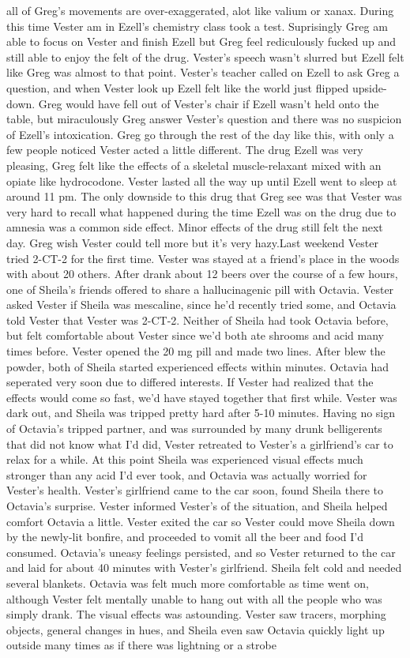 \documentclass[12pt]{book}
\begin{document}
all of Greg's movements are over-exaggerated, alot like valium or xanax. During this time Vester am in Ezell's chemistry class took a test. Suprisingly Greg am able to focus on Vester and finish Ezell but Greg feel rediculously fucked up and still able to enjoy the felt of the drug. Vester's speech wasn't slurred but Ezell felt like Greg was almost to that point. Vester's teacher called on Ezell to ask Greg a question, and when Vester look up Ezell felt like the world just flipped upside-down. Greg would have fell out of Vester's chair if Ezell wasn't held onto the table, but miraculously Greg answer Vester's question and there was no suspicion of Ezell's intoxication. Greg go through the rest of the day like this, with only a few people noticed Vester acted a little different. The drug Ezell was very pleasing, Greg felt like the effects of a skeletal muscle-relaxant mixed with an opiate like hydrocodone. Vester lasted all the way up until Ezell went to sleep at around 11 pm. The only downside to this drug that Greg see was that Vester was very hard to recall what happened during the time Ezell was on the drug due to amnesia was a common side effect. Minor effects of the drug still felt the next day. Greg wish Vester could tell more but it's very hazy.Last weekend Vester tried 2-CT-2 for the first time. Vester was stayed at a friend's place in the woods with about 20 others. After drank about 12 beers over the course of a few hours, one of Sheila's friends offered to share a hallucinagenic pill with Octavia. Vester asked Vester if Sheila was mescaline, since he'd recently tried some, and Octavia told Vester that Vester was 2-CT-2. Neither of Sheila had took Octavia before, but felt comfortable about Vester since we'd both ate shrooms and acid many times before. Vester opened the 20 mg pill and made two lines. After blew the powder, both of Sheila started experienced effects within minutes. Octavia had seperated very soon due to differed interests. If Vester had realized that the effects would come so fast, we'd have stayed together that first while. Vester was dark out, and Sheila was tripped pretty hard after 5-10 minutes. Having no sign of Octavia's tripped partner, and was surrounded by many drunk belligerents that did not know what I'd did, Vester retreated to Vester's a girlfriend's car to relax for a while. At this point Sheila was experienced visual effects much stronger than any acid I'd ever took, and Octavia was actually worried for Vester's health. Vester's girlfriend came to the car soon, found Sheila there to Octavia's surprise. Vester informed Vester's of the situation, and Sheila helped comfort Octavia a little. Vester exited the car so Vester could move Sheila down by the newly-lit bonfire, and proceeded to vomit all the beer and food I'd consumed. Octavia's uneasy feelings persisted, and so Vester returned to the car and laid for about 40 minutes with Vester's girlfriend. Sheila felt cold and needed several blankets. Octavia was felt much more comfortable as time went on, although Vester felt mentally unable to hang out with all the people who was simply drank. The visual effects was astounding. Vester saw tracers, morphing objects, general changes in hues, and Sheila even saw Octavia quickly light up outside many times as if there was lightning or a strobe 
\end{document}
